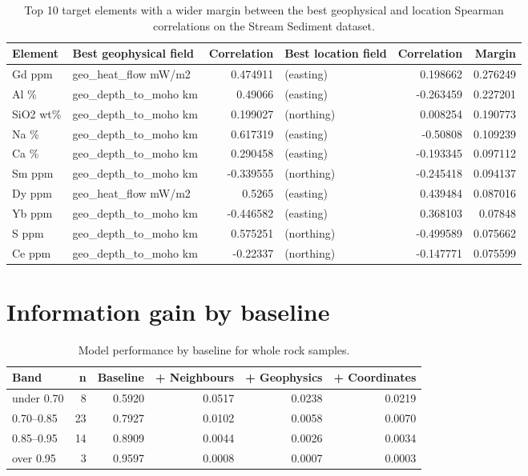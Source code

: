 \begin{table}[H]
\centering
\begin{tabular}{l l r l r r}
\hline
\textbf{Element} & \textbf{Best geophysical field} & \textbf{ Correlation} & \textbf{Best location field} & \textbf{Correlation} & \textbf{Margin} \\
\hline
Gd ppm    & geo\_heat\_flow mW/m2   & 0.474911  & (easting)  & 0.198662  & 0.276249 \\
Al \%     & geo\_depth\_to\_moho km & 0.49066   & (easting)  & -0.263459 & 0.227201 \\
SiO2 wt\% & geo\_depth\_to\_moho km & 0.199027  & (northing) & 0.008254  & 0.190773 \\
Na \%     & geo\_depth\_to\_moho km & 0.617319  & (easting)  & -0.50808  & 0.109239 \\
Ca \%     & geo\_depth\_to\_moho km & 0.290458  & (easting)  & -0.193345 & 0.097112 \\
Sm ppm    & geo\_depth\_to\_moho km & -0.339555 & (northing) & -0.245418 & 0.094137 \\
Dy ppm    & geo\_heat\_flow mW/m2   & 0.5265    & (easting)  & 0.439484  & 0.087016 \\
Yb ppm    & geo\_depth\_to\_moho km & -0.446582 & (easting)  & 0.368103  & 0.07848 \\
S ppm	&geo\_depth\_to\_moho km&	0.575251 &	(northing)	&-0.499589 &	0.075662 \\
Ce ppm	&geo\_depth\_to\_moho km&	-0.22337 &	(northing) &	-0.147771 &	0.075599 \\
\hline
\end{tabular}
\caption{Top 10 target elements with a wider margin between the best geophysical and location Spearman correlations on the Stream Sediment dataset.}
\label{tab:geophysics-streamsediment}
\end{table}


\section{Information gain by baseline}
\label{app:baseline-binning}

\begin{table}[H]
\centering
\begin{tabular}{l r r r r r}
\hline
\textbf{Band} & \textbf{n} & \textbf{Baseline} & \textbf{+ Neighbours} & \textbf{+ Geophysics} & \textbf{+ Coordinates} \\
\hline
under 0.70 & 8  & 0.5920 & 0.0517 & 0.0238 & 0.0219 \\
0.70--0.85 & 23 & 0.7927 & 0.0102 & 0.0058 & 0.0070 \\
0.85--0.95 & 14 & 0.8909 & 0.0044 & 0.0026 & 0.0034 \\
over 0.95  & 3  & 0.9597 & 0.0008 & 0.0007 & 0.0003 \\
\hline
\end{tabular}
\caption{Model performance by baseline for whole rock samples.}
\label{tab:whole-rock-bands}
\end{table}

